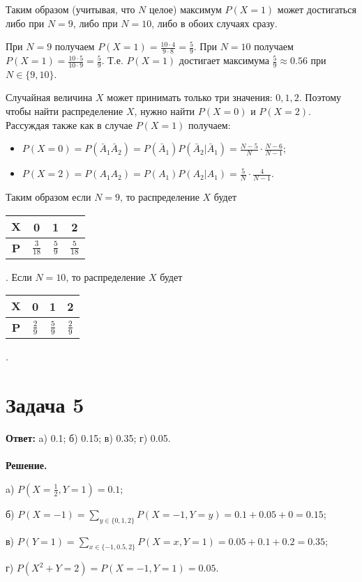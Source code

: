 \documentclass{article}
\begin{document}
\par
Таким образом (учитывая, что $N$ целое) максимум $P(X=1)$ может достигаться либо при $N=9$, либо при $N=10$, либо в обоих случаях сразу. 
\par
При $N=9$ получаем $P(X=1)=\frac{10\cdot 4}{9\cdot 8}=\frac{5}{9}$. При $N=10$ получаем $P(X=1)=\frac{10\cdot 5}{10\cdot 9}=\frac{5}{9}$. Т.е. $P(X=1)$ достигает максимума $\frac{5}{9}\approx 0.56$ при $N\in\{9, 10\}$. 
\par
Случайная величина $X$ может принимать только три значения: $0,1,2$. Поэтому чтобы найти распределение $X$, нужно найти $P(X=0)$ и $P(X=2)$. Рассуждая также как в случае $P(X=1)$ получаем:
\begin{itemize}
    \item $P(X=0)=P(\bar A_1 \bar A_2)=P(\bar A_1)P(\bar A_2|\bar A_1)=\frac{N-5}{N}\cdot\frac{N-6}{N-1}$;
    \item $P(X=2)=P(A_1 A_2)=P(A_1)P(A_2|A_1)=\frac{5}{N}\cdot\frac{4}{N-1}$.    
\end{itemize}
\par
Таким образом если $N=9$, то распределение $X$ будет \begin{tabular}{|c|c|c|c|}
     \hline
     $\textbf{X}$ & 0 & 1 & 2\\
     \hline
     \textbf{P} & $\frac{3}{18}$ & $\frac{5}{9}$ & $\frac{5}{18}$\\
     \hline
\end{tabular}.
Если $N=10$, то распределение $X$ будет \begin{tabular}{|c|c|c|c|}
     \hline
     $\textbf{X}$ & 0 & 1 & 2\\
     \hline
     \textbf{P} & $\frac{2}{9}$ & $\frac{5}{9}$ & $\frac{2}{9}$\\
     \hline
\end{tabular}.
\section*{Задача 5}
{\bf Ответ: } a) 0.1; б) 0.15; в) 0.35; г) 0.05.
\\
\\
{\bf Решение.}
\par
a) $P(X=\frac{1}{2}, Y=1)=0.1$;
\par
б) $P(X=-1)=\sum\limits_{y\in\{0,1,2\}} P(X=-1,Y=y)=0.1+0.05+0=0.15$;
\par
в) $P(Y=1)=\sum\limits_{x\in\{-1,0.5,2\}} P(X=x,Y=1)=0.05+0.1+0.2=0.35$;
\par
г) $P(X^2+Y=2)=P(X=-1,Y=1)=0.05$. 
\end{document}
